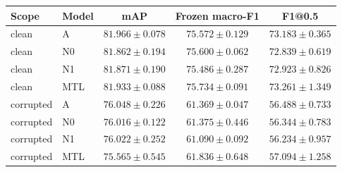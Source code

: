 \begin{tabular}{llccc}
\toprule
Scope & Model & mAP & Frozen macro-F1 & F1@0.5 \\
\midrule
clean & A & $81.966 \pm 0.078$ & $75.572 \pm 0.129$ & $73.183 \pm 0.365$ \\
clean & N0 & $81.862 \pm 0.194$ & $75.600 \pm 0.062$ & $72.839 \pm 0.619$ \\
clean & N1 & $81.871 \pm 0.190$ & $75.486 \pm 0.287$ & $72.923 \pm 0.826$ \\
clean & MTL & $81.933 \pm 0.088$ & $75.734 \pm 0.091$ & $73.261 \pm 1.349$ \\
corrupted & A & $76.048 \pm 0.226$ & $61.369 \pm 0.047$ & $56.488 \pm 0.733$ \\
corrupted & N0 & $76.016 \pm 0.122$ & $61.375 \pm 0.446$ & $56.344 \pm 0.783$ \\
corrupted & N1 & $76.022 \pm 0.252$ & $61.090 \pm 0.092$ & $56.234 \pm 0.957$ \\
corrupted & MTL & $75.565 \pm 0.545$ & $61.836 \pm 0.648$ & $57.094 \pm 1.258$ \\
\bottomrule
\end{tabular}
